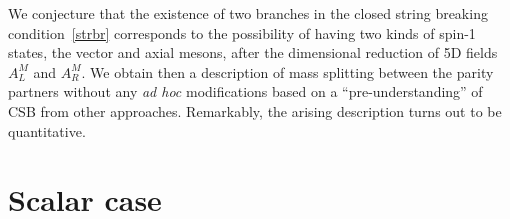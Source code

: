 \documentclass[a4paper,11pt]{article}
\begin{document}
We conjecture that the existence of two branches in the closed string breaking condition~\eqref{strbr}
corresponds to the possibility of having two kinds of spin-1 states, the vector and axial mesons, after
the dimensional reduction of 5D fields $A^M_L$ and $A^M_R$. We obtain then a description of mass splitting between
the parity partners without any {\it ad hoc} modifications
based on a ``pre-understanding'' of CSB from other approaches.
Remarkably, the arising description turns out to be quantitative.





\section{Scalar case}
\end{document}
